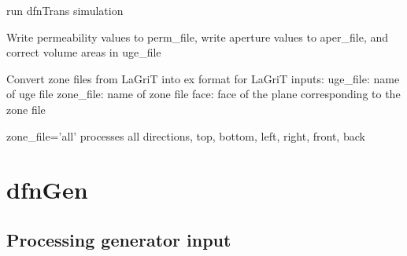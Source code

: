\documentclass[letterpaper,10pt,english]{sphinxmanual}
\begin{document}
\begin{fulllineitems}
\begin{fulllineitems}
\end{fulllineitems}


\begin{fulllineitems}
\label{pydfnworks:pydfnworks.DFNWORKS.run_dfnTrans}
run dfnTrans simulation

\end{fulllineitems}


\begin{fulllineitems}
\label{pydfnworks:pydfnworks.DFNWORKS.write_perms_and_correct_volumes_areas}
Write permeability values to perm\_file, write aperture values to aper\_file, and correct volume areas in uge\_file

\end{fulllineitems}


\begin{fulllineitems}
\label{pydfnworks:pydfnworks.DFNWORKS.zone2ex}
Convert zone files from LaGriT into ex format for LaGriT
inputs:
uge\_file: name of uge file
zone\_file: name of zone file
face: face of the plane corresponding to the zone file

zone\_file='all' processes all directions, top, bottom, left, right, front, back

\end{fulllineitems}


\end{fulllineitems}



\section{dfnGen}
\label{pydfnworks:dfngen}

\subsection{Processing generator input}
\label{pydfnworks:processing-generator-input}\label{pydfnworks:module-pydfnworks.gen_input}
\end{document}
